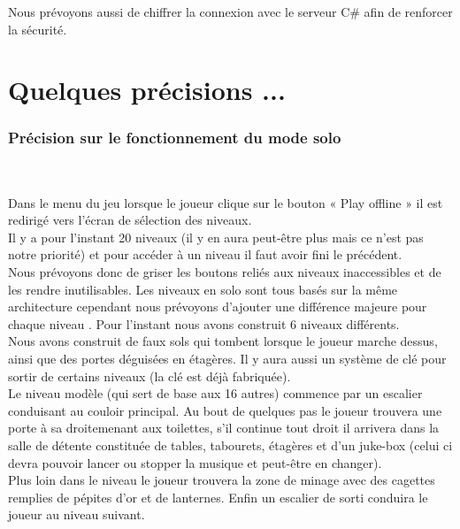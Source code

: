 \documentclass[titlepage, 13px, a4paper]{report}
\begin{document}
Nous prévoyons aussi de chiffrer la connexion avec le serveur C\# afin de renforcer la sécurité.


\newpage




\part{Quelques précisions ...}

\section{Précision sur le fonctionnement du mode solo}
\paragraph{} \hspace{0pt} \\
Dans le menu du jeu lorsque le joueur clique sur le bouton « Play offline » il est redirigé vers l'écran de sélection des niveaux. \\
Il y a pour l'instant 20 niveaux (il y en aura peut-être plus mais ce n'est pas notre priorité) et pour accéder à un niveau 
il faut avoir fini le précédent. \\
Nous prévoyons donc de griser les boutons reliés aux niveaux inaccessibles et de les rendre inutilisables. 
Les niveaux en solo sont tous basés sur la même architecture cependant nous prévoyons d'ajouter une différence majeure pour chaque niveau . 
Pour l'instant nous avons construit 6 niveaux différents. \\
Nous avons construit de faux sols qui tombent lorsque le joueur marche dessus, 
ainsi que des portes déguisées en étagères. Il y aura aussi un système de clé pour sortir de certains niveaux (la clé est déjà fabriquée). \\
Le niveau modèle (qui  sert de base aux 16 autres) commence par un escalier conduisant au couloir principal. 
Au bout de quelques pas le joueur trouvera une porte à sa droitemenant aux toilettes, s'il continue tout droit il arrivera dans la 
salle de détente constituée de tables, tabourets, étagères et d'un juke-box (celui ci devra pouvoir lancer ou stopper la musique 
et peut-être en changer). \\
Plus loin dans le niveau le joueur trouvera la zone de minage avec des cagettes remplies de pépites d'or et de lanternes. 
Enfin un escalier de sorti conduira le joueur au niveau suivant.
\end{document}
